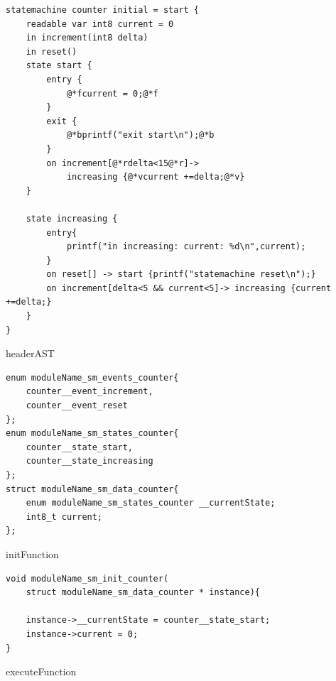 \documentclass[a4paper,10pt,titlepage]{report}
\begin{document}
\begin{lstlisting}
statemachine counter initial = start { 
    readable var int8 current = 0
    in increment(int8 delta)  
    in reset()
    state start { 
        entry { 
            @*fcurrent = 0;@*f  
        } 
        exit {
            @*bprintf("exit start\n");@*b
        }  
        on increment[@*rdelta<15@*r]-> 
            increasing {@*vcurrent +=delta;@*v}
    }
	  
    state increasing {
        entry{
            printf("in increasing: current: %d\n",current);
        }
        on reset[] -> start {printf("statemachine reset\n");}
        on increment[delta<5 && current<5]-> increasing {current +=delta;}
    } 
}
\end{lstlisting}
{\setlength{\parindent}{0cm}
headerAST
}
\begin{lstlisting}
enum moduleName_sm_events_counter{
    counter__event_increment,
    counter__event_reset 
};
enum moduleName_sm_states_counter{
    counter__state_start,
    counter__state_increasing 
};
struct moduleName_sm_data_counter{
    enum moduleName_sm_states_counter __currentState;
    int8_t current;
};
\end{lstlisting}   
{\setlength{\parindent}{0cm}
initFunction
}
\begin{lstlisting}
void moduleName_sm_init_counter(
    struct moduleName_sm_data_counter * instance){

    instance->__currentState = counter__state_start;
    instance->current = 0;
}
\end{lstlisting}    
\newpage
{\setlength{\parindent}{0cm}
executeFunction
}
\end{document}
